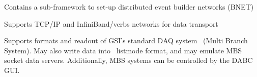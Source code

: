 \item Contains a sub-framework to set-up distributed event builder networks (BNET) 
 
\item Supports TCP/IP and InfiniBand/verbs networks for data transport

\item Supports formats and readout of GSI's standard DAQ system \mbs\
   (Multi Branch System). May also write data into \mbs\ listmode format,
   and may emulate MBS socket data servers.
   Additionally, MBS systems can be controlled by the DABC GUI.  
\enum

% 
% 
% 

